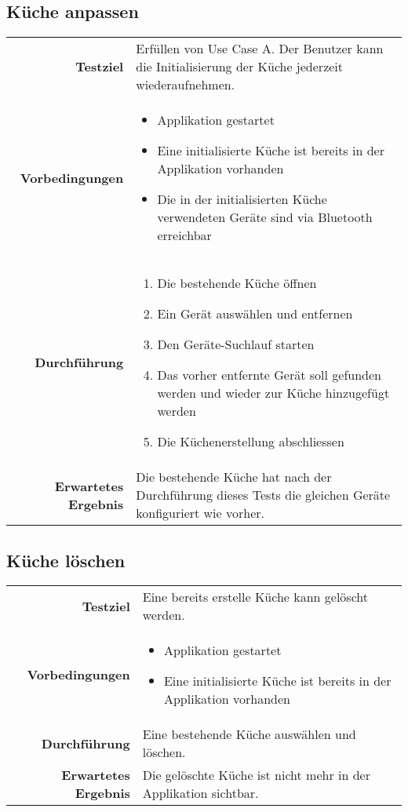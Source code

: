 \subsection{Küche anpassen}
\begin{table}[H]
\begin{tabularx}{\textwidth}{r X }
\textbf{Testziel} & Erfüllen von Use Case A. Der Benutzer kann die Initialisierung der Küche jederzeit wiederaufnehmen.\\
\textbf{Vorbedingungen} & \begin{itemize}
\item Applikation gestartet
\item Eine initialisierte Küche ist bereits in der Applikation vorhanden
\item Die in der initialisierten Küche verwendeten Geräte sind via Bluetooth erreichbar
\end{itemize} \\
\textbf{Durchführung} & \begin{enumerate}
\item Die bestehende Küche öffnen
\item Ein Gerät auswählen und entfernen
\item Den Geräte-Suchlauf starten
\item Das vorher entfernte Gerät soll gefunden werden und wieder zur Küche hinzugefügt werden
\item Die Küchenerstellung abschliessen
\end{enumerate} \\
\textbf{Erwartetes Ergebnis} & Die bestehende Küche hat nach der Durchführung dieses Tests die gleichen Geräte konfiguriert wie vorher.\\
\end{tabularx}
\end{table}

\subsection{Küche löschen}
\begin{table}[H]
\begin{tabularx}{\textwidth}{r X }
\textbf{Testziel} & Eine bereits erstelle Küche kann gelöscht werden.\\
\textbf{Vorbedingungen} & \begin{itemize}
\item Applikation gestartet
\item Eine initialisierte Küche ist bereits in der Applikation vorhanden
\end{itemize} \\
\textbf{Durchführung} & Eine bestehende Küche auswählen und löschen. \\
\textbf{Erwartetes Ergebnis} & Die gelöschte Küche ist nicht mehr in der Applikation sichtbar.\\
\end{tabularx}
\end{table}

